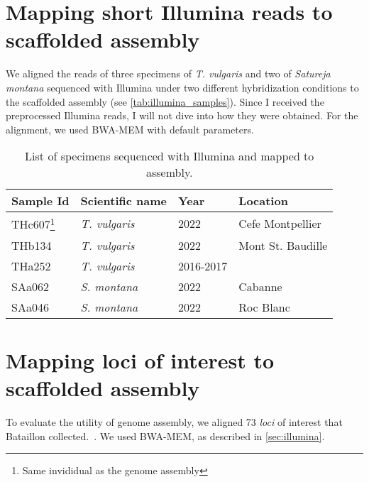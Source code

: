\section{Mapping short Illumina reads to scaffolded assembly}\label{sec:illumina}

We aligned the reads of three specimens of \textit{T. vulgaris} and two of \textit{Satureja montana} sequenced with Illumina under two different hybridization conditions to the scaffolded assembly (see \autoref{tab:illumina_samples}). Since I received the preprocessed Illumina reads, I will not dive into how they were obtained. For the alignment, we used BWA-MEM with default parameters. ~\cite{liAligningSequenceReads2013}

\begin{table}[h!]
    \begin{minipage}{\linewidth}
    \renewcommand\thefootnote{\thempfootnote}
    \centering
    \begin{tabular}{@{}llll@{}}
    \toprule
    Sample Id & Scientific name                      & Year & Location     \\ \midrule
    THc607\footnote{Same invididual as the genome assembly}    & \textit{T. vulgaris}                          & 2022   &  Cefe Montpellier  \\
    THb134    & \textit{T. vulgaris}                 & 2022  & Mont St. Baudille   \\
    THa252    & \textit{T. vulgaris}                 & 2016-2017 & \\
    SAa062    & \textit{S. montana} & 2022 & Cabanne     \\
    SAa046    & \textit{S. montana} & 2022  & Roc Blanc    \\ \bottomrule
    \end{tabular}
    \caption{List of specimens sequenced with Illumina and mapped to assembly. }
    \label{tab:illumina_samples}
    \end{minipage}
    \end{table}

\section{Mapping loci of interest to scaffolded assembly}

To evaluate the utility of genome assembly, we aligned 73 \textit{loci} of interest that  Bataillon \etal collected.~\cite{bataillonGenotypePhenotypeGenetic2022}. We used BWA-MEM, as described in \autoref{sec:illumina}. 